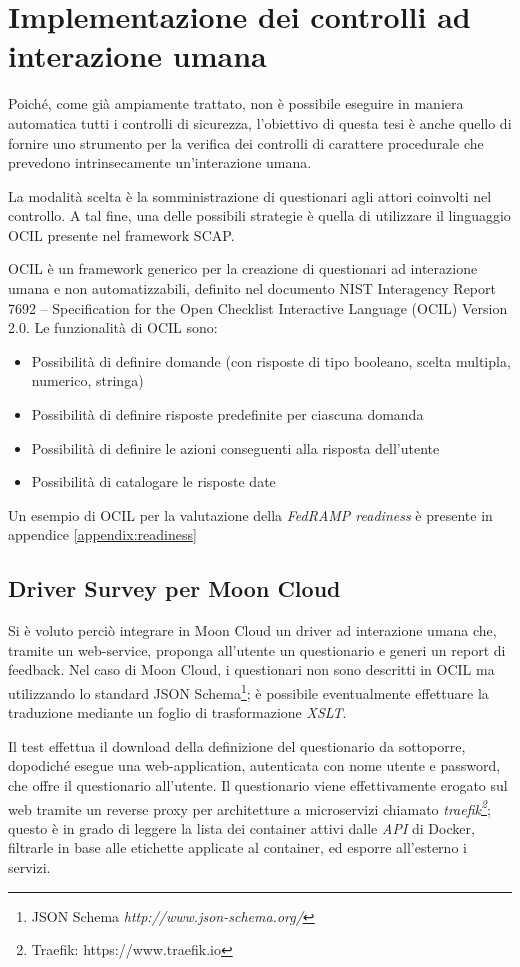 \documentclass[../main.tex]{subfiles}
\begin{document}
\section{Implementazione dei controlli ad interazione umana}
Poiché, come già ampiamente trattato, non è possibile eseguire in maniera automatica tutti i controlli di sicurezza, l'obiettivo di questa tesi è
anche quello di fornire uno strumento per la verifica dei controlli di carattere procedurale che prevedono intrinsecamente un'interazione umana.

La modalità scelta è la somministrazione di questionari agli attori coinvolti nel controllo. A tal fine, una delle possibili strategie è quella di utilizzare
il linguaggio OCIL presente nel framework SCAP.

OCIL è un framework generico per la creazione di questionari ad interazione umana e non automatizzabili, definito nel documento NIST Interagency Report 7692 – Specification for the Open Checklist Interactive Language (OCIL) Version 2.0.
Le funzionalità di OCIL sono:
\begin{itemize}
    \item Possibilità di definire domande (con risposte di tipo booleano, scelta multipla, numerico, stringa)
    \item Possibilità di definire risposte predefinite per ciascuna domanda
    \item Possibilità di definire le azioni conseguenti alla risposta dell'utente 
    \item Possibilità di catalogare le risposte date
\end{itemize}
Un esempio di OCIL per la valutazione della \textit{FedRAMP readiness} è presente in appendice \ref{appendix:readiness}

\subsection{Driver Survey per Moon Cloud}
\label{subsec:surveymooncloud}
Si è voluto perciò integrare in Moon Cloud un driver ad interazione umana che, tramite un web-service, proponga all'utente un questionario e generi un report di feedback.
Nel caso di Moon Cloud, i questionari non sono descritti in OCIL ma utilizzando lo standard JSON Schema\footnote{JSON Schema \textit{http://www.json-schema.org/}}; è possibile eventualmente effettuare la traduzione mediante un foglio di trasformazione \textit{XSLT}.

Il test effettua il download della definizione del questionario da sottoporre, dopodiché esegue una web-application, autenticata con nome utente e password, che offre il questionario all'utente.
Il questionario viene effettivamente erogato sul web tramite un reverse proxy per architetture a microservizi chiamato \textit{traefik\footnote{Traefik: https://www.traefik.io}}; questo è in grado di leggere la lista dei container attivi dalle \textit{API} di Docker, filtrarle in base alle etichette applicate al container, ed esporre all'esterno i servizi.
\end{document}
